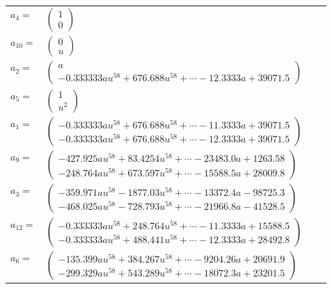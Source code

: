 \documentclass[1p]{elsarticle_modified}
\theoremstyle{definition}
\begin{document}
\begin{tabular}{m{7pt} m{180pt} m{7pt} m{180pt} }
\flushright $a_{4}=$&$\begin{pmatrix}1\\0\end{pmatrix}$ \\
\flushright $a_{10}=$&$\begin{pmatrix}0\\u\end{pmatrix}$ \\
\flushright $a_{2}=$&$\begin{pmatrix}a\\-0.333333 a u^{58}+676.688 u^{58}+\cdots-12.3333 a+39071.5\end{pmatrix}$ \\
\flushright $a_{5}=$&$\begin{pmatrix}1\\u^2\end{pmatrix}$ \\
\flushright $a_{1}=$&$\begin{pmatrix}-0.333333 a u^{58}+676.688 u^{58}+\cdots-11.3333 a+39071.5\\-0.333333 a u^{58}+676.688 u^{58}+\cdots-12.3333 a+39071.5\end{pmatrix}$ \\
\flushright $a_{9}=$&$\begin{pmatrix}-427.925 a u^{58}+83.4254 u^{58}+\cdots-23483.0 a+1263.58\\-248.764 a u^{58}+673.597 u^{58}+\cdots-15588.5 a+28009.8\end{pmatrix}$ \\
\flushright $a_{3}=$&$\begin{pmatrix}-359.971 a u^{58}-1877.03 u^{58}+\cdots-13372.4 a-98725.3\\-468.025 a u^{58}-728.793 u^{58}+\cdots-21966.8 a-41528.5\end{pmatrix}$ \\
\flushright $a_{12}=$&$\begin{pmatrix}-0.333333 a u^{58}+248.764 u^{58}+\cdots-11.3333 a+15588.5\\-0.333333 a u^{58}+488.441 u^{58}+\cdots-12.3333 a+28492.8\end{pmatrix}$ \\
\flushright $a_{6}=$&$\begin{pmatrix}-135.399 a u^{58}+384.267 u^{58}+\cdots-9204.26 a+20691.9\\-299.329 a u^{58}+543.289 u^{58}+\cdots-18072.3 a+23201.5\end{pmatrix}$ \\

\end{tabular}
\end{document}
